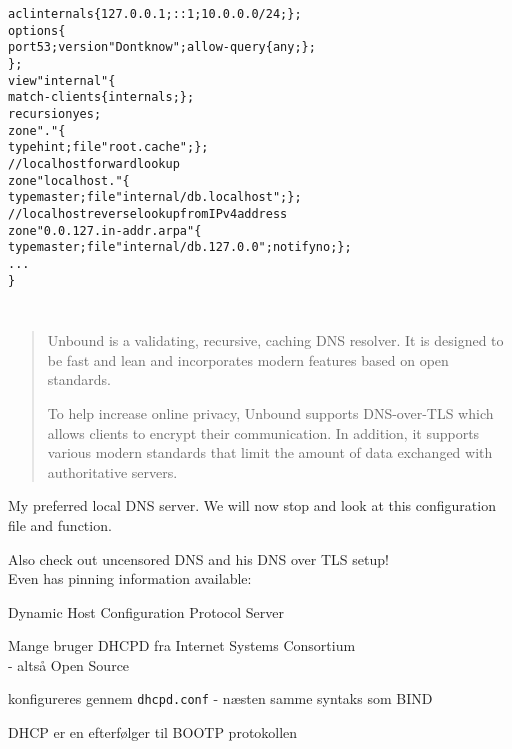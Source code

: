\documentclass[Screen16to9,17pt]{foils}
\begin{document}

\begin{alltt}\small
acl internals \{ 127.0.0.1; ::1; 10.0.0.0/24; \};
options \{
        port 53; version "Dont know"; allow-query \{ any; \};
\};
view "internal" \{
   match-clients \{ internals; \};
   recursion yes;
   zone "." \{
       type hint;   file "root.cache"; \};
   // localhost forward lookup
   zone "localhost." \{
        type master; file "internal/db.localhost";   \};
   // localhost reverse lookup from IPv4 address
   zone "0.0.127.in-addr.arpa" \{
        type master; file "internal/db.127.0.0"; notify no;   \};
...
\}
\end{alltt}



\inputminted{bash}{programs/bind-version}


\inputminted{perl}{programs/dns-timecheck}


\begin{quote}
Unbound is a validating, recursive, caching DNS resolver. It is designed to be fast and lean and incorporates modern features based on open standards.

To help increase online privacy, Unbound supports DNS-over-TLS which allows clients to encrypt their communication. In addition, it supports various modern standards that limit the amount of data exchanged with authoritative servers.
\end{quote}


My preferred local DNS server. We will now stop and look at this configuration file and function.

Also check out uncensored DNS and his DNS over TLS setup!\\
Even has pinning information available:\\ {\small{}}


\begin{list1}
\item Dynamic Host Configuration Protocol Server
\item Mange bruger DHCPD fra Internet Systems Consortium\\
   - altså Open Source
\item konfigureres gennem \verb+dhcpd.conf+ - næsten samme syntaks som BIND
\item DHCP er en efterfølger til BOOTP protokollen
\end{list1}
\end{document}
